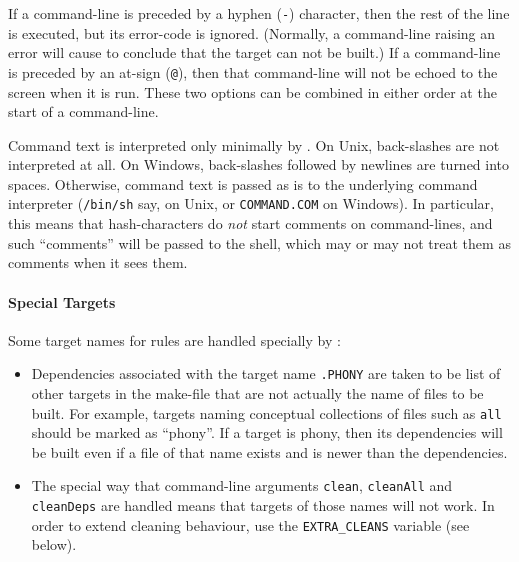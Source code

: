 If a command-line is preceded by a hyphen (\verb!-!) character, then
the rest of the line is executed, but its error-code is ignored.
(Normally, a command-line raising an error will cause \holmake{} to
conclude that the target can not be built.)  If a command-line is
preceded by an at-sign (\verb!@!), then that command-line will not be
echoed to the screen when it is run.  These two options can be
combined in either order at the start of a command-line.

Command text is interpreted only minimally by \holmake.  On Unix,
back-slashes are not interpreted at all.  On Windows, back-slashes
followed by newlines are turned into spaces. Otherwise, command text
is passed as is to the underlying command interpreter
(\texttt{/bin/sh} say, on Unix, or \texttt{COMMAND.COM} on Windows).
In particular, this means that hash-characters do \emph{not} start
comments on command-lines, and such ``comments'' will be passed to the
shell, which may or may not treat them as comments when it sees them.

\paragraph{Special Targets}
Some target names for rules are handled specially by \holmake{}:
\begin{itemize}
\item Dependencies associated with the target name \texttt{.PHONY} are taken to be list of other targets in the make-file that are not actually the name of files to be built.
For example, targets naming conceptual collections of files such as \texttt{all} should be marked as ``phony''.
If a target is phony, then its dependencies will be built even if a file of that name exists and is newer than the dependencies.
\item The special way that command-line arguments \texttt{clean}, \texttt{cleanAll} and \texttt{cleanDeps} are handled means that targets of those names will not work.
In order to extend cleaning behaviour, use the \texttt{EXTRA\_CLEANS} variable (see below).
\end{itemize}
